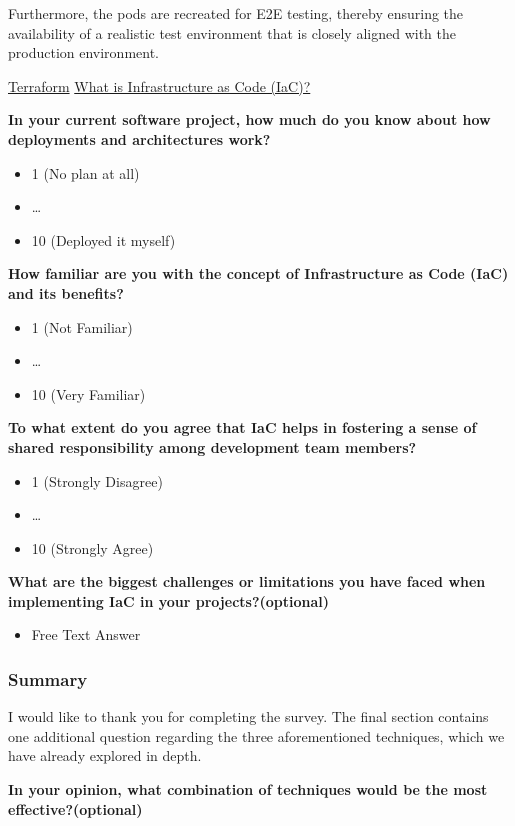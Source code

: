 Furthermore, the pods are recreated for E2E testing, thereby ensuring the availability of a realistic test environment that is closely aligned with the production environment.

\href{https://www.terraform.io/}{Terraform} 
\href{https://www.redhat.com/en/topics/automation/what-is-infrastructure-as-code-iac}{What is Infrastructure as Code (IaC)?} 


\textbf{In your current software project, how much do you know about how deployments and architectures work?}
\begin{itemize}
    \item 1 (No plan at all)
    \item \dots
    \item 10 (Deployed it myself)
\end{itemize}

\textbf{How familiar are you with the concept of Infrastructure as Code (IaC) and its benefits?}
\begin{itemize}
    \item 1 (Not Familiar)
    \item \dots
    \item 10 (Very Familiar)
\end{itemize}

\textbf{To what extent do you agree that IaC helps in fostering a sense of shared responsibility among development team members?}
\begin{itemize}
    \item 1 (Strongly Disagree)
    \item \dots
    \item 10 (Strongly Agree)
\end{itemize}

\textbf{What are the biggest challenges or limitations you have faced when implementing IaC in your projects?(optional)}
\begin{itemize}
    \item Free Text Answer
\end{itemize}

\subsubsection*{Summary}
I would like to thank you for completing the survey. The final section contains one additional question regarding the three aforementioned techniques, which we have already explored in depth.

\textbf{In your opinion, what combination of techniques would be the most effective?(optional)}

